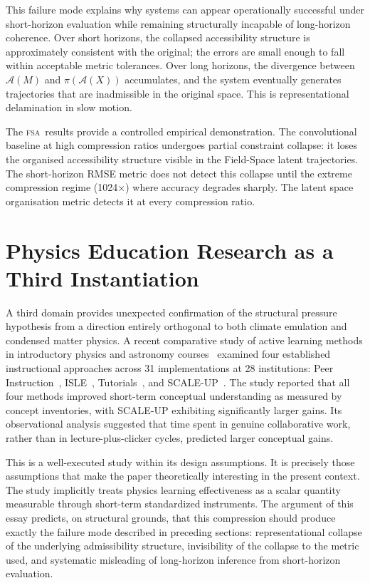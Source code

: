 \documentclass[11pt,a4paper]{article}
\theoremstyle{plain}
\theoremstyle{definition}
\theoremstyle{remark}
\newcommand{\A}{\mathcal{A}}
\newcommand{\FSA}{\textup{\textsc{fsa}}}
\begin{document}
This failure mode explains why systems can appear operationally successful
under short-horizon evaluation while remaining structurally incapable of
long-horizon coherence. Over short horizons, the collapsed accessibility
structure is approximately consistent with the original; the errors are small
enough to fall within acceptable metric tolerances. Over long horizons,
the divergence between $\A(M)$ and $\pi(\A(X))$ accumulates, and the
system eventually generates trajectories that are inadmissible in the
original space. This is representational delamination in slow motion.

The \FSA\ results provide a controlled empirical demonstration. The
convolutional baseline at high compression ratios undergoes partial
constraint collapse: it loses the organised accessibility structure visible
in the Field-Space latent trajectories. The short-horizon RMSE metric does
not detect this collapse until the extreme compression regime (1024$\times$)
where accuracy degrades sharply. The latent space organisation metric
detects it at every compression ratio.

\section{Physics Education Research as a Third Instantiation}
\label{sec:edu}

A third domain provides unexpected confirmation of the structural pressure
hypothesis from a direction entirely orthogonal to both climate emulation
and condensed matter physics. A recent comparative study of active learning
methods in introductory physics and astronomy courses~\cite{Sundstrom2025}
examined four established instructional approaches across 31 implementations
at 28 institutions: Peer Instruction~\cite{Mazur1997}, ISLE~\cite{Etkina2007},
Tutorials~\cite{McDermott2002}, and SCALE-UP~\cite{Beichner2007}. The study
reported that all four methods improved short-term conceptual understanding
as measured by concept inventories, with SCALE-UP exhibiting significantly
larger gains. Its observational analysis suggested that time spent in genuine
collaborative work, rather than in lecture-plus-clicker cycles, predicted
larger conceptual gains.

This is a well-executed study within its design assumptions. It is precisely
those assumptions that make the paper theoretically interesting in the present
context. The study implicitly treats physics learning effectiveness as a
scalar quantity measurable through short-term standardized instruments. The
argument of this essay predicts, on structural grounds, that this compression
should produce exactly the failure mode described in preceding sections:
representational collapse of the underlying admissibility structure, invisibility
of the collapse to the metric used, and systematic misleading of long-horizon
inference from short-horizon evaluation.
\end{document}
